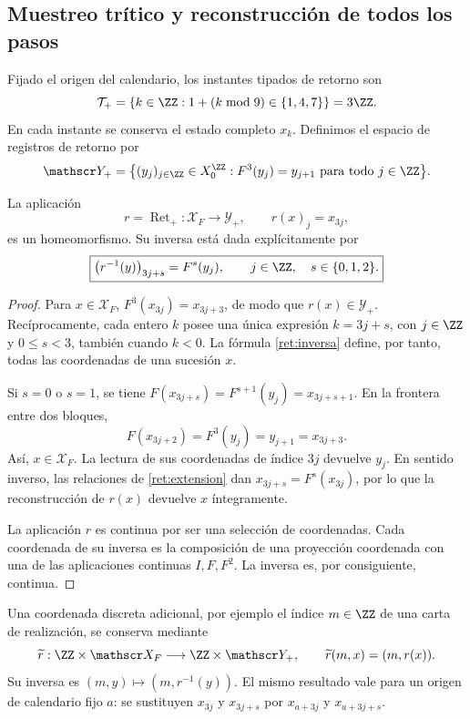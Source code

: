 \subsection{Muestreo trítico y reconstrucción de todos los pasos}

Fijado el origen del calendario, los instantes tipados de retorno son
\[
 \mathcal T_+
 =\{k\in\ZZ:1+(k\bmod 9)\in\{1,4,7\}\}=3\ZZ.
\]
En cada instante se conserva el estado completo \(x_k\).
Definimos el espacio de registros de retorno por
\begin{equation}
 \mathscr Y_+
 =\bigl\{(y_j)_{j\in\ZZ}\in X_0^{\ZZ}:
                 F^3(y_j)=y_{j+1}\text{ para todo }j\in\ZZ\bigr\}.
 \label{ret:registros}
\end{equation}

\begin{theorem}
\label{ret:homeomorfismo}
La aplicación
\[
 r=\operatorname{Ret}_+:\mathscr X_F\longrightarrow\mathscr Y_+,
 \qquad r(x)_j=x_{3j},
\]
es un homeomorfismo. Su inversa está dada explícitamente por
\begin{equation}
 \boxed{
  \bigl(r^{-1}(y)\bigr)_{3j+s}=F^s(y_j),
  \qquad j\in\ZZ,\quad s\in\{0,1,2\}.}
 \label{ret:inversa}
\end{equation}
\end{theorem}
\begin{proof}
Para \(x\in\mathscr X_F\),
\(F^3(x_{3j})=x_{3j+3}\), de modo que \(r(x)\in\mathscr Y_+\).
Recíprocamente, cada entero \(k\) posee una única expresión
\(k=3j+s\), con \(j\in\ZZ\) y \(0\le s<3\), también cuando
\(k<0\). La fórmula \eqref{ret:inversa} define, por tanto, todas las
coordenadas de una sucesión \(x\).

Si \(s=0\) o \(s=1\), se tiene
\(F(x_{3j+s})=F^{s+1}(y_j)=x_{3j+s+1}\).
En la frontera entre dos bloques,
\[
 F(x_{3j+2})=F^3(y_j)=y_{j+1}=x_{3j+3}.
\]
Así, \(x\in\mathscr X_F\).
La lectura de sus coordenadas de índice \(3j\) devuelve \(y_j\).
En sentido inverso, las relaciones de \eqref{ret:extension} dan
\(x_{3j+s}=F^s(x_{3j})\), por lo que la reconstrucción de \(r(x)\)
devuelve \(x\) íntegramente.

La aplicación \(r\) es continua por ser una selección de coordenadas.
Cada coordenada de su inversa es la composición de una proyección
coordenada con una de las aplicaciones continuas \(I,F,F^2\).
La inversa es, por consiguiente, continua.
\end{proof}

Una coordenada discreta adicional, por ejemplo el índice \(m\in\ZZ\)
de una carta de realización, se conserva mediante
\[
 \widetilde r:\ZZ\times\mathscr X_F
 \longrightarrow\ZZ\times\mathscr Y_+,
 \qquad \widetilde r(m,x)=(m,r(x)).
\]
Su inversa es \((m,y)\mapsto(m,r^{-1}(y))\).
El mismo resultado vale para un origen de calendario fijo \(a\):
se sustituyen \(x_{3j}\) y \(x_{3j+s}\) por
\(x_{a+3j}\) y \(x_{a+3j+s}\).

